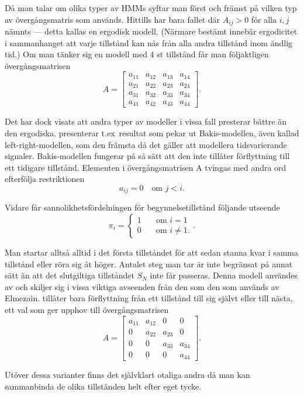 \documentclass[../rapport_MVEX01-11-05]{subfiles}
\begin{document}
Då man talar om olika typer av HMMs syftar man först och främst på
vilken typ av övergångsmatris som används. Hittills har bara 
fallet där $A_{ij} > 0$ för alla $i,j$ nämnts --- detta kallas en ergodisk
modell. (Närmare bestämt innebär ergodicitet i sammanhanget att varje
tillstånd kan nås från alla andra tillstånd inom ändlig tid.) Om man
tänker sig en modell med 4 st tillstånd får man följaktligen övergångsmatrisen
\begin{equation*}
A = \begin{bmatrix}
a_{11} & a_{12} & a_{13} & a_{14}\\
a_{21} & a_{22} & a_{23} & a_{24}\\
a_{31} & a_{32} & a_{33} & a_{34}\\
a_{41} & a_{42} & a_{43} & a_{44}
\end{bmatrix}.  
\end{equation*} 

Det har dock visats att andra typer av modeller i vissa fall presterar
bättre än den ergodiska. 
presenterar t.ex~resultat som pekar ut Bakis-modellen, även kallad
left-right-modellen, som den främsta då det gäller att modellera
tidsvarierande signaler. Bakis-modellen fungerar på så sätt att den
inte tillåter förflyttning till ett tidigare tillstånd. Elementen i
övergångsmatrisen A tvingas med andra ord efterfölja restriktionen
\begin{equation*}
a_{ij} = 0 \quad\text{om }j<i.
\end{equation*}

Vidare får sannolikhetsfördelningen för begynnelsetillstånd följande
utseende
\begin{equation*}
\pi_i = \begin{cases}
         1 & \quad\text{om } i = 1\\
         0 & \quad\text{om } i \neq 1.\end{cases}.
\end{equation*}  

Man startar alltså alltid i det första tillståndet för att sedan
stanna kvar i samma tillstånd eller röra sig åt höger. Antalet steg
man tar är inte begränsat på annat sätt än att det slutgiltiga
tillståndet $S_N$ inte får passeras. Denna modell användes av
 och skiljer sig i vissa viktiga avseenden från
den som den som används av Elmezain.  tillåter bara
förflyttning från
ett tillstånd till sig självt eller till nästa, ett val som ger upphov
till övergångsmatrisen
\begin{equation*}
A = \begin{bmatrix}
a_{11} & a_{12} & 0 & 0\\
0 & a_{22} & a_{23} & 0\\
0 & 0 & a_{33} & a_{34}\\
0 & 0 & 0 & a_{44}
\end{bmatrix}.  
\end{equation*} 

Utöver dessa varianter finns det självklart otaliga andra då man kan
sammanbinda de olika tillstånden helt efter eget tycke.  
\end{document}
